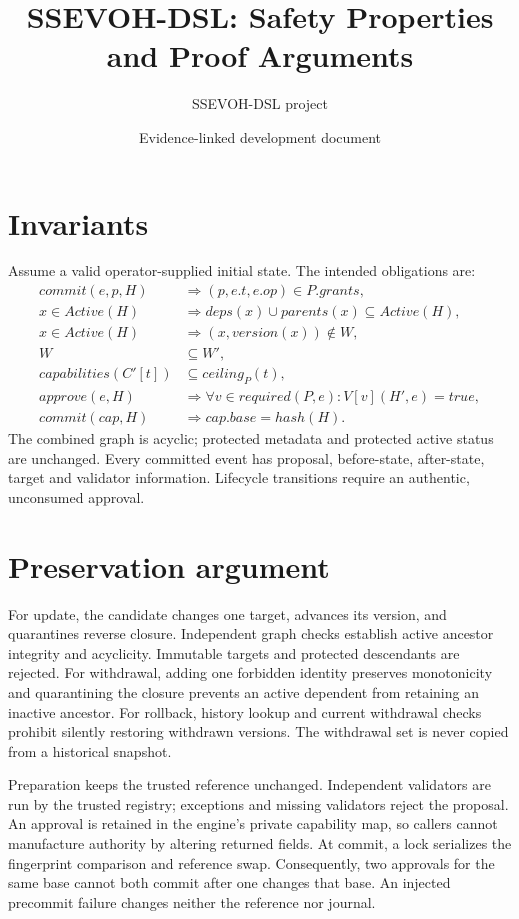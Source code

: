 \documentclass[11pt]{article}
\title{SSEVOH-DSL: Safety Properties and Proof Arguments}
\author{SSEVOH-DSL project}
\date{Evidence-linked development document}
\begin{document}
\maketitle

\section{Invariants}
Assume a valid operator-supplied initial state. The intended obligations are:
\begin{align*}
commit(e,p,H)&\Rightarrow(p,e.t,e.op)\in P.grants,\\
x\in Active(H)&\Rightarrow deps(x)\cup parents(x)\subseteq Active(H),\\
x\in Active(H)&\Rightarrow(x,version(x))\notin W,\\
W&\subseteq W',\\
capabilities(C'[t])&\subseteq ceiling_P(t),\\
approve(e,H)&\Rightarrow\forall v\in required(P,e):V[v](H',e)=true,\\
commit(cap,H)&\Rightarrow cap.base=hash(H).
\end{align*}
The combined graph is acyclic; protected metadata and protected active status are unchanged. Every committed event has proposal, before-state, after-state, target and validator information. Lifecycle transitions require an authentic, unconsumed approval.

\section{Preservation argument}
For update, the candidate changes one target, advances its version, and quarantines reverse closure. Independent graph checks establish active ancestor integrity and acyclicity. Immutable targets and protected descendants are rejected. For withdrawal, adding one forbidden identity preserves monotonicity and quarantining the closure prevents an active dependent from retaining an inactive ancestor. For rollback, history lookup and current withdrawal checks prohibit silently restoring withdrawn versions. The withdrawal set is never copied from a historical snapshot.

Preparation keeps the trusted reference unchanged. Independent validators are run by the trusted registry; exceptions and missing validators reject the proposal. An approval is retained in the engine's private capability map, so callers cannot manufacture authority by altering returned fields. At commit, a lock serializes the fingerprint comparison and reference swap. Consequently, two approvals for the same base cannot both commit after one changes that base. An injected precommit failure changes neither the reference nor journal.
\end{document}
